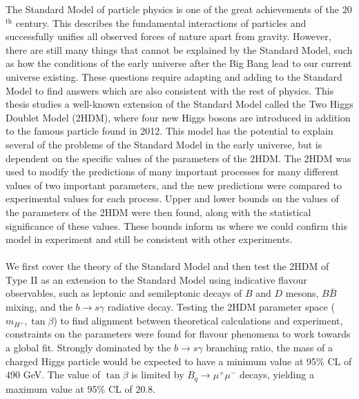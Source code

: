 \documentclass[10pt]{article} %
\begin{document}
\begin{paracol}{2}
The Standard Model of particle physics is one of the great achievements of the 20$^{\text{th}}$ century. 
This describes the fundamental interactions of particles and successfully unifies all observed forces of nature apart from gravity. 
However, there are still many things that cannot be explained by the Standard Model, such as how the conditions of the early universe after the Big Bang lead to our current universe existing. 
These questions require adapting and adding to the Standard Model to find answers which are also consistent with the rest of physics.
This thesis studies a well-known extension of the Standard Model called the Two Higgs Doublet Model (2HDM), where four new Higgs bosons are introduced in addition to the famous particle found in 2012.
This model has the potential to explain several of the problems of the Standard Model in the early universe, but is dependent on the specific values of the parameters of the 2HDM. 
The 2HDM was used to modify the predictions of many important processes for many different values of two important parameters, and the new predictions were compared to experimental values for each process. 
Upper and lower bounds on the values of the parameters of the 2HDM were then found, along with the statistical significance of these values. 
These bounds inform us where we could confirm this model in experiment and still be consistent with other experiments.
\\\\
We first cover the theory of the Standard Model and then test the 2HDM of Type II as an extension to the Standard Model using indicative flavour observables, such as leptonic and semileptonic decays of $B$ and $D$ mesons, $B\bar{B}$ mixing, and the $b\to s\gamma$ radiative decay.
Testing the 2HDM parameter space ($m_{H^+},\tan\beta$) to find alignment between theoretical calculations and experiment, constraints on the parameters were found for flavour phenomena to work towards a global fit.
Strongly dominated by the $b\to s\gamma$ branching ratio, the mass of a charged Higgs particle would be expected to have a minimum value at 95\% CL of $490$ GeV.%
The value of $\tan\beta$ is limited by $B_q\to\mu^+\mu^-$ decays, yielding a maximum value at 95\% CL of $20.8$.%

\end{paracol}
\end{document}

